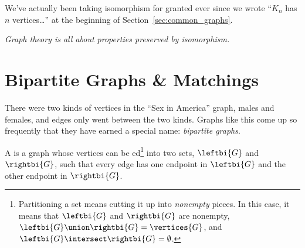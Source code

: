 We've actually been taking isomorphism for granted ever since we wrote
``$K_n$ has $n$ vertices\dots'' at the beginning of
Section~\ref{sec:common_graphs}.  

\iffalse
A pickier sentence is ``Any graph isomorphic to some graph
that is a $K_n$ has $n$ vertices\dots.''  But since having $n$
vertices is a property preserved by isomorphism, the picky version is
unnecessary if not silly.
\fi

\emph{Graph theory is all about properties preserved by isomorphism.}

\begin{problems}
\practiceproblems
{}

\classproblems
{}

\homeworkproblems
{}


\end{problems}


\section{Bipartite Graphs \& Matchings}\label{bipartitesec}


There were two kinds of vertices in the ``Sex in America'' graph,
males and females, and edges only went between the two kinds.  Graphs
like this come up so frequently that they have earned a special
name: \emph{bipartite graphs}.

\begin{definition}
  A   is a graph whose vertices can be
  ed\footnote{Partitioning a set means cutting it up into
    \emph{nonempty} pieces.  In this case, it means that $\leftbi{G}$ and
    $\rightbi{G}$ are nonempty, $\leftbi{G} \union \rightbi{G} =
    \vertices{G}$, and $\leftbi{G} \intersect \rightbi{G} =
    \emptyset$.} into two sets, $\leftbi{G}$ and
    $\rightbi{G}$, such that every edge has one endpoint in
    $\leftbi{G}$ and the other endpoint in $\rightbi{G}$.
\end{definition}

